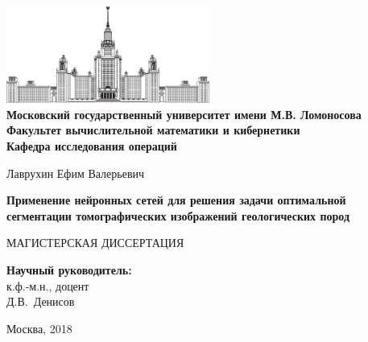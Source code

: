\documentclass[14pt, a4paper, oneside, bold]{extarticle}
\begin{document}
\allowdisplaybreaks[1]

\begin{titlepage}
\begin{center}
\ \vspace{-1.5cm}

\includegraphics[width=0.5\textwidth]{msu_logo.eps}\\
{\bfseries Московский государственный университет имени М.В. Ломоносова \\
Факультет вычислительной математики и кибернетики\\
Кафедра исследования операций}

\vspace{3cm}

{\Large Лаврухин Ефим Валерьевич}

\vspace{1cm}

{\Large\bfseries
Применение нейронных сетей для решения задачи оптимальной сегментации томографических
изображений геологических пород\\}

\vspace{1cm}

{\textbf \large МАГИСТЕРСКАЯ ДИССЕРТАЦИЯ}
\end{center}

\vfill

\begin{flushright}
  \textbf{Научный руководитель:}\\
  к.ф.-м.н., доцент\\
  Д.В.~Денисов
\end{flushright}

\vfill

\begin{center}
Москва, 2018
\end{center}

\vspace{1cm}

\enlargethispage{2\baselineskip}

\end{titlepage}

\end{document}

